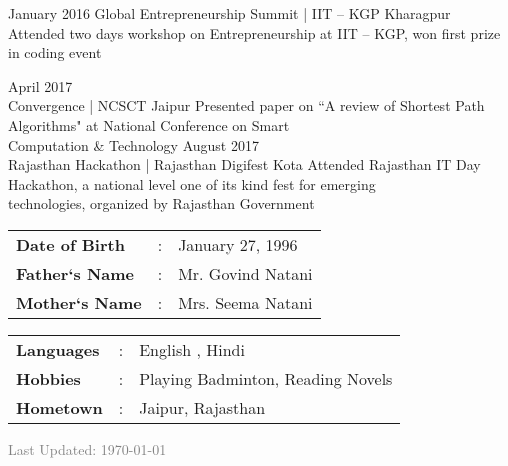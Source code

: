 \documentclass[9pt]{myOwnClass}
\begin{document}
\begin{entrylist}
	\entry
		{January 2016}
		{Global Entrepreneurship Summit | IIT -- KGP}
		{Kharagpur}
		{Attended two days workshop on Entrepreneurship at IIT -- KGP, won first prize in coding event}
	
	\entry
		{April 2017\\}
		{Convergence | NCSCT}
		{Jaipur}
		{Presented paper on ``A review of Shortest Path Algorithms" at National Conference on Smart \\Computation \& Technology}
		\entry
		{August 2017\\}
		{Rajasthan Hackathon | Rajasthan Digifest}
		{Kota}
		{Attended Rajasthan IT Day Hackathon, a national level one of its kind fest for emerging \\technologies, organized by Rajasthan Government}
\end{entrylist}


\begin{minipage}[t]{0.50\textwidth}
	\vspace{-\baselineskip}
	\begin{tabular}[tbhp]{l c l}
	\textbf{Date of Birth} & \quad : \quad & January 27, 1996\\
	\textbf{Father`s Name} & \quad : \quad & Mr. Govind Natani\\
	\textbf{Mother`s Name} & \quad : \quad & Mrs. Seema Natani
	\end{tabular}
\end{minipage}
\hfill
\begin{minipage}[t]{0.50\textwidth}
	\vspace{-\baselineskip}
	\begin{tabular}[tbhp]{l c l}
	\textbf{Languages} & \quad : \quad &  English , Hindi\\
	\textbf{Hobbies} & \quad : \quad &  Playing Badminton, Reading Novels\\
	\textbf{Hometown} & \quad : \quad &  Jaipur, Rajasthan\\[1.2in]
	\end{tabular}
\end{minipage}
\begin{minipage}[t]{1\textwidth}
\begin{flushright}\small\textcolor{gray}{Last Updated: \today}\end{flushright}
\end{minipage}
\end{document}
